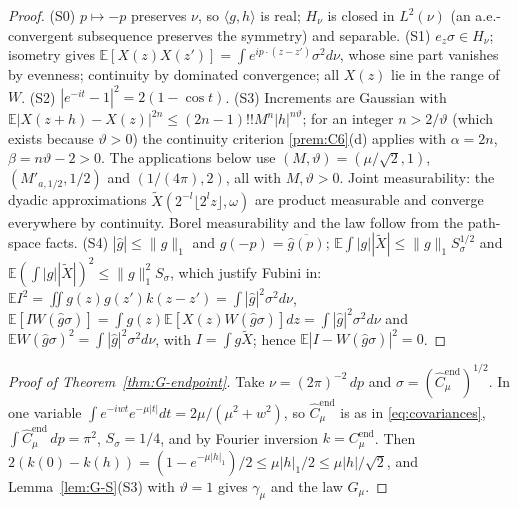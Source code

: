 \documentclass[11pt]{article}
\theoremstyle{plain}
\theoremstyle{definition}
\theoremstyle{remark}
\newcommand{\E}{\mathbb{E}}
\newcommand{\Cend}{C^{\mathrm{end}}_{\mu}}
\newcommand{\hCend}{\hat C^{\mathrm{end}}_{\mu}}
\newcommand{\conj}[1]{\overline{#1}}
\begin{document}
\begin{proof}
(S0) $p\mapsto-p$ preserves $\nu$, so $\langle g,h\rangle$ is real; $H_\nu$ is closed in $L^{2}(\nu)$ (an
a.e.-convergent subsequence preserves the symmetry) and separable. (S1)
$e_z\sigma\in H_\nu$; isometry gives $\E[X(z)X(z')]=\int e^{ip\cdot(z-z')}\sigma^{2}d\nu$, whose sine part vanishes
by evenness; continuity by dominated convergence; all $X(z)$ lie in the range of $W$.
(S2) $|e^{-it}-1|^{2}=2(1-\cos t)$. (S3) Increments are Gaussian with
$\E|X(z+h)-X(z)|^{2n}\le(2n-1)!!M^{n}|h|^{n\vartheta}$; for an integer $n>2/\vartheta$ (which
exists because $\vartheta>0$) the continuity criterion \ref{prem:C6}(d) applies with
$\alpha=2n$, $\beta=n\vartheta-2>0$. The applications below use $(M,\vartheta)=(\mu/\sqrt2,1)$,
$(M'_{a,1/2},1/2)$ and $(1/(4\pi),2)$, all with $M,\vartheta>0$. Joint measurability: the dyadic
approximations $\tilde X(2^{-l}\lfloor2^{l}z\rfloor,\omega)$ are product measurable and converge everywhere by
continuity. Borel measurability and the law follow from the path-space facts.
(S4) $|\hat g|\le\|g\|_1$ and $\hat g(-p)=\conj{\hat g(p)}$; $\E\int|g||\tilde X|\le\|g\|_1S_\sigma^{1/2}$ and
$\E(\int|g||\tilde X|)^{2}\le\|g\|_1^{2}S_\sigma$, which justify Fubini in:
$\E I^{2}=\iint g(z)g(z')k(z-z')=\int|\hat g|^{2}\sigma^{2}d\nu$,
$\E[IW(\hat g\sigma)]=\int g(z)\E[X(z)W(\hat g\sigma)]dz=\int|\hat g|^{2}\sigma^{2}d\nu$ and
$\E W(\hat g\sigma)^{2}=\int|\hat g|^{2}\sigma^{2}d\nu$, with $I=\int g\tilde X$; hence $\E|I-W(\hat g\sigma)|^{2}=0$.
\end{proof}

\begin{proof}[Proof of Theorem~\ref{thm:G-endpoint}]
Take $\nu=(2\pi)^{-2}\,dp$ and $\sigma=(\hCend)^{1/2}$. In one variable
$\int e^{-iwt}e^{-\mu|t|}dt=2\mu/(\mu^{2}+w^{2})$, so $\hCend$ is as in \eqref{eq:covariances},
$\int\hCend\,dp=\pi^{2}$, $S_\sigma=1/4$, and by Fourier inversion $k=\Cend$. Then
$2(k(0)-k(h))=(1-e^{-\mu|h|_1})/2\le\mu|h|_1/2\le\mu|h|/\sqrt2$, and Lemma~\ref{lem:G-S}(S3) with
$\vartheta=1$ gives $\gamma_\mu$ and the law $G_\mu$.
\end{proof}
\end{document}
